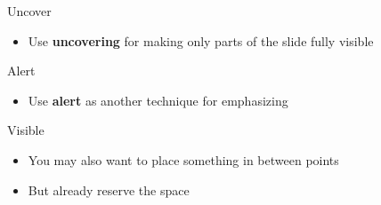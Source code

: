 \documentclass{beamer}
\begin{document}
\begin{frame}
    \begin{block}{Uncover}
        \begin{itemize}
            \item Use \textbf{uncovering} for making only parts of the slide fully visible
        \end{itemize}
    \end{block}
\end{frame}

\begin{frame}
    \begin{block}{Alert}
        \begin{itemize}
            \item Use \textbf{alert} as another technique for emphasizing
        \end{itemize}
    \end{block}
\end{frame}

\begin{frame}
    \begin{block}{Visible}
        \begin{itemize}
            \item You may also want to place something in between points
            \item But already reserve the space
        \end{itemize}
    \end{block}
\end{frame}
\end{document}
